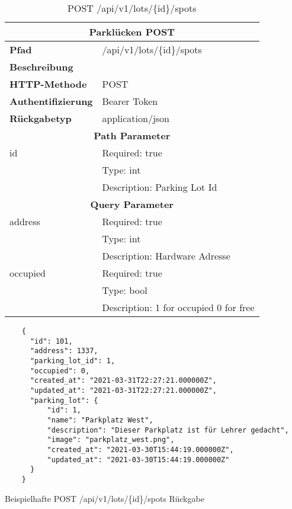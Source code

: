 \begin{table}[H]
  \centering
  \begin{tabular}{|l|l|}
  \hline
  \multicolumn{2}{|c|}{\textbf{Parklücken POST}}                  \\ \hline
  \textbf{Pfad}              & /api/v1/lots/\{id\}/spots              \\ \hline
  \textbf{Beschreibung}      &                                        \\ \hline
  \textbf{HTTP-Methode}      & POST                                   \\ \hline
  \textbf{Authentifizierung} & Bearer Token                           \\ \hline
  \textbf{Rückgabetyp}       & application/json                       \\ \hline
  \multicolumn{2}{|c|}{\textbf{Path Parameter}}                       \\ \hline
  id                         & Required: true                         \\ \hline
                             & Type: int                              \\ \hline
                             & Description: Parking Lot Id            \\ \hline
  \multicolumn{2}{|c|}{\textbf{Query Parameter}}                      \\ \hline
  address                    & Required: true                         \\ \hline
                             & Type: int                              \\ \hline
                             & Description: Hardware Adresse          \\ \hline
  occupied                   & Required: true                         \\ \hline
                             & Type: bool                             \\ \hline
                             & Description: 1 for occupied 0 for free \\ \hline
  \end{tabular}
  \caption{POST /api/v1/lots/\{id\}/spots}
\end{table}

\begin{listing}[H]
  \begin{verbatim}
    {
      "id": 101,
      "address": 1337,
      "parking_lot_id": 1,
      "occupied": 0,
      "created_at": "2021-03-31T22:27:21.000000Z",
      "updated_at": "2021-03-31T22:27:21.000000Z",
      "parking_lot": {
          "id": 1,
          "name": "Parkplatz West",
          "description": "Dieser Parkplatz ist für Lehrer gedacht",
          "image": "parkplatz_west.png",
          "created_at": "2021-03-30T15:44:19.000000Z",
          "updated_at": "2021-03-30T15:44:19.000000Z"
      }
    }
  \end{verbatim}
  \caption{Beispielhafte POST /api/v1/lots/\{id\}/spots Rückgabe}
\end{listing}

